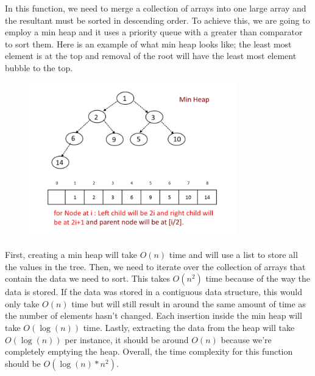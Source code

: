 \documentclass{article}
\begin{document}
In this function, we need to merge a collection of arrays into one large array and the resultant must be sorted in descending order.
To achieve this, we are going to employ a min heap and it uses a priority queue with a greater than comparator to sort them.
Here is an example of what min heap looks like; the least most element is at the top and removal of the root will have the least most element bubble to the top.

\begin{figure}[!h]
\centering
\includegraphics[width=9cm]{min_heap}
\end{figure}

First, creating a min heap will take $O(n)$ time and will use a list to store all the values in the tree.
Then, we need to iterate over the collection of arrays that contain the data we need to sort.
This takes $O(n^{2})$ time because of the way the data is stored. 
If the data was stored in a contiguous data structure, this would only take $O(n)$ time but will still result in around the same amount of time as the number of elements hasn't changed.
Each insertion inside the min heap will take $O(\log(n))$ time.
Lastly, extracting the data from the heap will take $O(\log(n))$ per instance, it should be around $O(n)$ because we're completely emptying the heap.
Overall, the time complexity for this function should be $O(\log(n) * n^{2})$.
\end{document}

